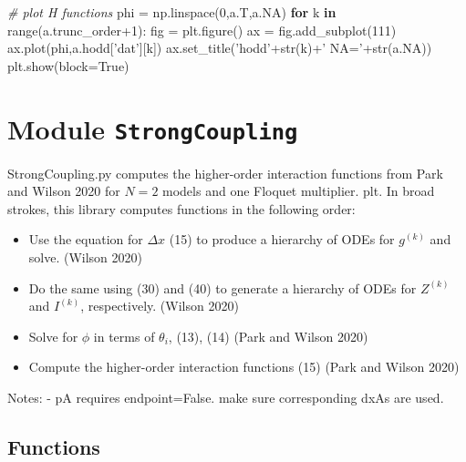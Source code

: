 \documentclass[english,a4paper,oneside]{article}
\newenvironment{Shaded}{}{}
\newcommand{\KeywordTok}[1]{\textcolor[rgb]{0.00,0.44,0.13}{\textbf{#1}}}
\newcommand{\DecValTok}[1]{\textcolor[rgb]{0.25,0.63,0.44}{#1}}
\newcommand{\StringTok}[1]{\textcolor[rgb]{0.25,0.44,0.63}{#1}}
\newcommand{\CommentTok}[1]{\textcolor[rgb]{0.38,0.63,0.69}{\textit{#1}}}
\newcommand{\VariableTok}[1]{\textcolor[rgb]{0.10,0.09,0.49}{#1}}
\newcommand{\ControlFlowTok}[1]{\textcolor[rgb]{0.00,0.44,0.13}{\textbf{#1}}}
\newcommand{\OperatorTok}[1]{\textcolor[rgb]{0.40,0.40,0.40}{#1}}
\newcommand{\BuiltInTok}[1]{#1}
\newcommand{\NormalTok}[1]{#1}
\providecommand{\tightlist}{%
  \setlength{\itemsep}{0pt}\setlength{\parskip}{0pt}}
\begin{document}
\begin{Shaded}
\begin{Highlighting}[]
    \CommentTok{# plot H functions}
\NormalTok{    phi }\OperatorTok{=}\NormalTok{ np.linspace(}\DecValTok{0}\NormalTok{,a.T,a.NA)}
    \ControlFlowTok{for}\NormalTok{ k }\KeywordTok{in} \BuiltInTok{range}\NormalTok{(a.trunc_order}\OperatorTok{+}\DecValTok{1}\NormalTok{):}
\NormalTok{        fig }\OperatorTok{=}\NormalTok{ plt.figure()}
\NormalTok{        ax }\OperatorTok{=}\NormalTok{ fig.add_subplot(}\DecValTok{111}\NormalTok{)}
\NormalTok{        ax.plot(phi,a.hodd[}\StringTok{'dat'}\NormalTok{][k])}
\NormalTok{        ax.set_title(}\StringTok{'hodd'}\OperatorTok{+}\BuiltInTok{str}\NormalTok{(k)}\OperatorTok{+}\StringTok{' NA='}\OperatorTok{+}\BuiltInTok{str}\NormalTok{(a.NA))}
\NormalTok{        plt.show(block}\OperatorTok{=}\VariableTok{True}\NormalTok{)}
\end{Highlighting}
\end{Shaded}

\section{\texorpdfstring{Module
\texttt{StrongCoupling}}{Module StrongCoupling}}\label{StrongCoupling}

StrongCoupling.py computes the higher-order interaction functions from
Park and Wilson 2020 for \(N=2\) models and one Floquet multiplier. plt.
In broad strokes, this library computes functions in the following
order:

\begin{itemize}
\tightlist
\item
  Use the equation for \(\Delta x\) (15) to produce a hierarchy of ODEs
  for \(g^{(k)}\) and solve. (Wilson 2020)
\item
  Do the same using (30) and (40) to generate a hierarchy of ODEs for
  \(Z^{(k)}\) and \(I^{(k)}\), respectively. (Wilson 2020)
\item
  Solve for \(\phi\) in terms of \(\theta_i\), (13), (14) (Park and
  Wilson 2020)
\item
  Compute the higher-order interaction functions (15) (Park and Wilson
  2020)
\end{itemize}

Notes: - pA requires endpoint=False. make sure corresponding dxAs are
used.

\subsection{Functions}\label{functions}
\end{document}
